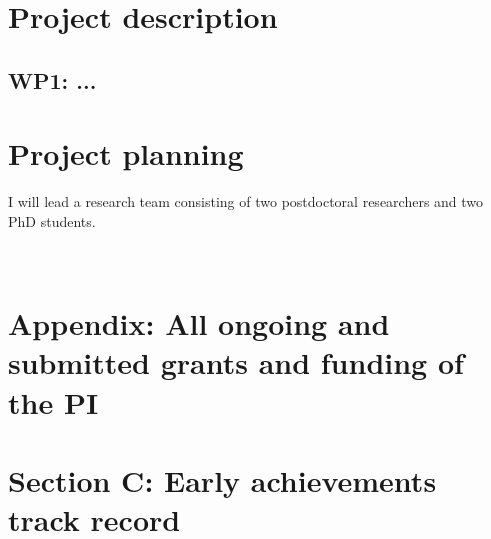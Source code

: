 \documentclass[11pt,a4paper]{article}
\begin{document}
\section{Project description}
\subsection{WP1: ...}

\section{Project planning}
I will lead a research team consisting of two postdoctoral researchers and two PhD students. 





\clearpage



~ 


\clearpage

%

\clearpage

\section*{Appendix: All ongoing and submitted grants and funding of the PI}

%

\clearpage

\section*{Section C: Early achievements track record}

%
\end{document}
